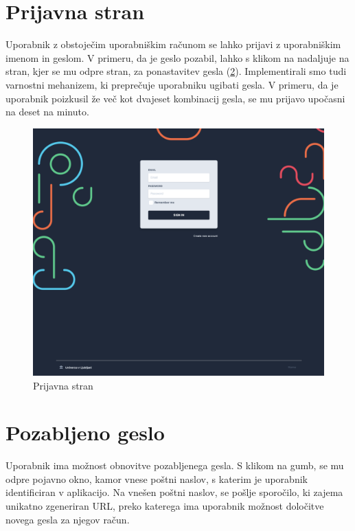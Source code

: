 \documentclass[a4paper, 12pt]{book}
\begin{document}
\section{Prijavna stran}
\label{sign-in-page}
Uporabnik z obstoječim uporabniškim računom se lahko prijavi z uporabniškim imenom in geslom. V primeru, da je geslo pozabil, lahko s klikom na  nadaljuje na stran, kjer se mu odpre stran, za ponastavitev gesla (\ref{forgotten-form}). Implementirali smo tudi varnostni mehanizem, ki preprečuje uporabniku ugibati gesla. V primeru, da je uporabnik poizkusil že več kot dvajeset kombinacij gesla, se mu prijavo upočasni na deset na minuto. 
\begin{figure}[h]
\begin{center}
\includegraphics[width=1\textwidth]{slike/login-page.png}
\end{center}
\caption{ Prijavna stran }
\label{login-form}
\end{figure}

\section{Pozabljeno geslo}
\label{forgotten-form}
Uporabnik ima možnost obnovitve pozabljenega gesla. S klikom na gumb, se mu odpre pojavno okno, kamor vnese poštni naslov, s katerim je uporabnik identificiran v aplikacijo. Na vnešen poštni naslov, se pošlje sporočilo, ki zajema unikatno zgeneriran URL, preko katerega ima uporabnik možnost določitve novega gesla za njegov račun. 
\end{document}
